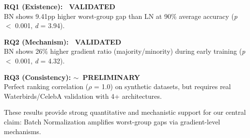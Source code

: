 \textbf{RQ1 (Existence): \checkmark~VALIDATED} \\
BN shows 9.41pp higher worst-group gap than LN at 90\% average accuracy (\emph{p} $<$ 0.001, \emph{d} = 3.94).

\textbf{RQ2 (Mechanism): \checkmark~VALIDATED} \\
BN shows 26\% higher gradient ratio (majority/minority) during early training (\emph{p} $<$ 0.001, \emph{d} = 4.32).

\textbf{RQ3 (Consistency): $\sim$~PRELIMINARY} \\
Perfect ranking correlation ($\rho$ = 1.0) on synthetic datasets, but requires real Waterbirds/CelebA validation with 4+ architectures.

These results provide strong quantitative and mechanistic support for our central claim: Batch Normalization amplifies worst-group gaps via gradient-level mechanisms.
